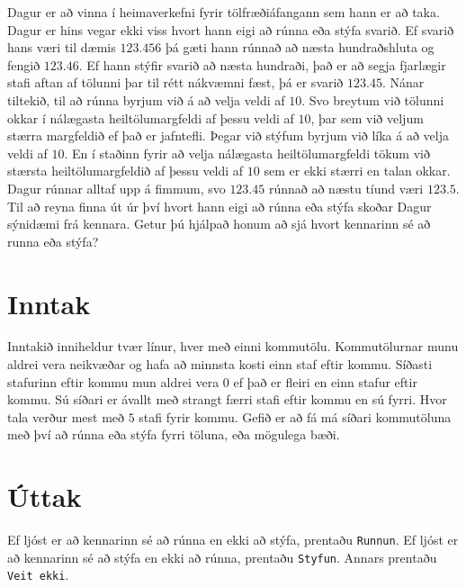 
Dagur er að vinna í heimaverkefni fyrir tölfræðiáfangann sem hann er að taka.
Dagur er hins vegar ekki viss hvort hann eigi að rúnna eða stýfa svarið. 
Ef svarið hans væri til dæmis $123.456$ þá gæti hann rúnnað að næsta hundraðshluta og fengið $123.46$.
Ef hann stýfir svarið að næsta hundraði, 
það er að segja fjarlægir stafi aftan af tölunni þar til rétt nákvæmni fæst,
þá er svarið $123.45$.
Nánar tiltekið, til að rúnna byrjum við á að velja veldi af $10$.
Svo breytum við tölunni okkar í nálægasta heiltölumargfeldi af þessu veldi af $10$,
þar sem við veljum stærra margfeldið ef það er jafntefli.
Þegar við stýfum byrjum við líka á að velja veldi af $10$.
En í staðinn fyrir að velja nálægasta heiltölumargfeldi tökum við stærsta
heiltölumargfeldið af þessu veldi af $10$ sem er ekki stærri en talan okkar.
Dagur rúnnar alltaf upp á fimmum, svo $123.45$ rúnnað að næstu tíund væri $123.5$.
Til að reyna finna út úr því hvort hann eigi að rúnna eða stýfa skoðar Dagur sýnidæmi frá kennara.
Getur þú hjálpað honum að sjá hvort kennarinn sé að runna eða stýfa?


\section*{Inntak}
Inntakið inniheldur tvær línur, hver með einni kommutölu. 
Kommutölurnar munu aldrei vera neikvæðar og hafa að minnsta kosti einn staf eftir kommu.
Síðasti stafurinn eftir kommu mun aldrei vera $0$ ef það er fleiri en einn stafur eftir kommu.
Sú síðari er ávallt með strangt færri stafi eftir kommu en sú fyrri.
Hvor tala verður mest með $5$ stafi fyrir kommu.
Gefið er að fá má síðari kommutöluna með því að rúnna eða stýfa fyrri töluna, eða mögulega bæði.

\section*{Úttak}
Ef ljóst er að kennarinn sé að rúnna en ekki að stýfa, prentaðu \texttt{Runnun}.
Ef ljóst er að kennarinn sé að stýfa en ekki að rúnna, prentaðu \texttt{Styfun}.
Annars prentaðu \texttt{Veit ekki}.

